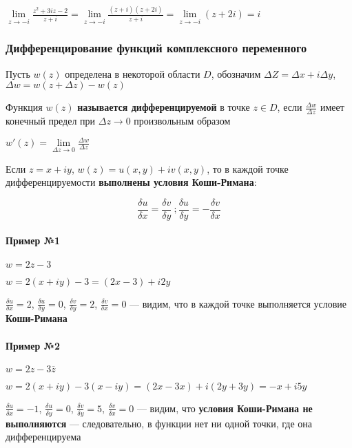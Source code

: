 \documentclass{article}
\begin{document}
$\lim\limits_{z \to -i} \frac{z^2 + 3 i z - 2}{z + i} = \lim\limits_{z \to -i} \frac{(z + i)(z + 2 i)}{z + i} = \lim\limits_{z \to -i} (z + 2 i) = i$

\subsubsection{Дифференцирование функций комплексного переменного}

Пусть $w (z)$ определена в некоторой области $D$, обозначим $\Delta Z = \Delta x + i \Delta y$, $\Delta w = w (z + \Delta z) - w (z)$

Функция $w(z)$ \textbf{называется дифференцируемой} в точке $z \in D$, если $\frac{\Delta w}{\Delta z}$ имеет конечный предел при $\Delta z \to 0$ произвольным образом

$w' (z) = \lim\limits_{\Delta z \to 0} \frac{\Delta w}{\Delta z}$

\hfill

Если $z = x + i y$, $w(z) = u(x, y) + i v (x, y)$, то в каждой точке дифференцируемости \textbf{выполнены условия Коши-Римана}:

$$
\frac{\delta u}{\delta x} = \frac{\delta v}{\delta y} \ ; \frac{\delta u}{\delta y} = - \frac{\delta v}{\delta x}
$$

\paragraph{Пример №1}

$w = 2 z - 3$

$w = 2 (x + i y) - 3 = (2 x - 3) + i 2 y$

$\frac{\delta u}{\delta x} = 2$, $\frac{\delta u}{\delta y} = 0$, $\frac{\delta v}{\delta y} = 2$, $\frac{\delta v}{\delta x} = 0$ — видим, что в каждой точке выполняется условие \textbf{Коши-Римана}

\paragraph{Пример №2}

$w = 2 z - 3 \overline{z}$

$w = 2 (x + i y) - 3 (x - i y) = (2 x - 3 x) + i (2y + 3 y) = -x + i 5 y$

$\frac{\delta u}{\delta x} = -1$, $\frac{\delta u}{\delta y} = 0$, $\frac{\delta v}{\delta y} = 5$, $\frac{\delta v}{\delta x} = 0$ — видим, что \textbf{условия Коши-Римана не выполняются} — следовательно, в функции нет ни одной точки, где она дифференцируема
\end{document}
